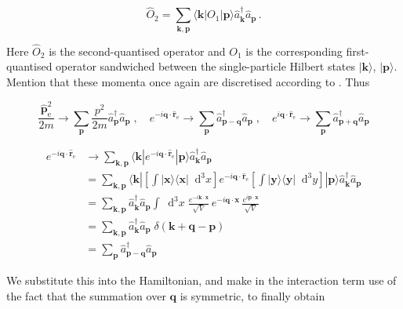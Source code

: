 \documentclass[12pt]{report}
\renewcommand{\vec}[1]{\boldsymbol{\mathbf{#1}}}                        %
\newcommand*\diff{\mathop{}\!\mathrm{d}}
\newcommand{\motivation}[1]{\textcolor{motivation}{#1}}
\newcommand{\todo}[1]{\textcolor{todo}{#1}}
\begin{document}
\begin{equation}
	\hat O_2 = \sum_{\vec k, \vec p} \langle \vec k | O_1 | \vec p \rangle \hat a^\dagger_{\vec k} \hat a_{\vec p} \,.
\end{equation}

Here $ \hat O_2 $ is the second-quantised operator and $ O_1 $ is the corresponding first-quantised operator sandwiched between the single-particle Hilbert states $ | \vec k \rangle $, $ | \vec p \rangle $. \todo{Mention that these momenta once again are discretised according to }. Thus

\begin{equation}
	\frac{\hat{\vec p}_\text{e}^2}{2m} \rightarrow \sum_{\vec p} \frac{p^2}{2m} \hat a^\dagger_{\vec p} \hat a_{\vec p}
	\; , \quad
	e^{-i \vec q \cdot \hat{ \vec r}_\text{e}} \rightarrow \sum_{\vec p} \hat a^\dagger_{\vec p - \vec q} \hat a_{\vec p}
	\; , \quad
	e^{i \vec q \cdot \hat{ \vec r}_\text{e}} \rightarrow \sum_{\vec p} \hat a^\dagger_{\vec p + \vec q} \hat a_{\vec p}
\end{equation}

\motivation{
\begin{equation}
	\begin{split}
		e^{-i \vec q \cdot \hat{ \vec r}_\text{e}}
		& \rightarrow \sum_{\vec k, \vec p} \langle \vec k | e^{-i \vec q \cdot \hat{ \vec r}_\text{e}} | \vec p \rangle \hat a^\dagger_{\vec k} \hat a_{\vec p} \\
		& = \sum_{\vec k, \vec p} \langle \vec k |
			\left[ \int | \vec x \rangle \langle \vec x | \diff^3 x \right]
			e^{-i \vec q \cdot \hat{ \vec r}_\text{e}}
			\left[ \int | \vec y \rangle \langle \vec y | \diff^3 y \right]
			| \vec p \rangle \hat a^\dagger_{\vec k} \hat a_{\vec p} \\
		& = \sum_{\vec k, \vec p} \hat a^\dagger_{\vec k} \hat a_{\vec p}
			\int \diff^3 x \;
			\frac{e^{- i \vec k \cdot \vec x}}{\sqrt{V}} \,
			e^{-i \vec q \cdot \vec x} \,
			 \frac{e^{i \vec p \cdot \vec x}}{\sqrt{V}} \\
		& = \sum_{\vec k, \vec p} \hat a^\dagger_{\vec k} \hat a_{\vec p}
			\; \delta( \vec k + \vec q - \vec p) \\
		& = \sum_{\vec p} \hat a^\dagger_{\vec p - \vec q} \hat a_{\vec p}
	\end{split}
\end{equation}
}

We substitute this into the Hamiltonian, and make in the interaction term use of the fact that the summation over $ \vec q $ is symmetric, to finally obtain
\end{document}
